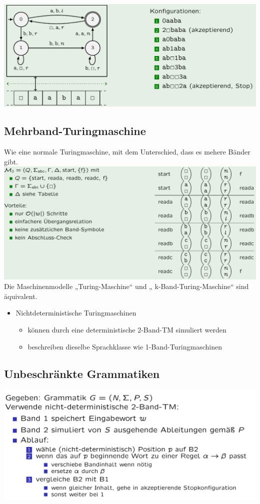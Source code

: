 \documentclass[12pt,a4paper]{article}
\begin{document}
	\begin{center}
	\includegraphics[width=\textwidth]{Bilder/Turing.png}
	\end{center}
	
	\subsection{Mehrband-Turingmaschine}
	Wie eine normale Turingmaschine, mit dem Unterschied, dass es mehere Bänder gibt.
	\includegraphics[width=\textwidth]{Bilder/MehrbandTuring.png}
	Die Maschinenmodelle „Turing-Maschine“ und „ k-Band-Turing-Maschine“ sind äquivalent.
	\begin{itemize}
		\item Nichtdeterministische Turingmaschinen
		\begin{itemize}
			\item können durch eine deterministische 2-Band-TM simuliert werden
			\item beschreiben dieselbe Sprachklasse wie 1-Band-Turingmaschinen
		\end{itemize}
	\end{itemize}

	\subsection{Unbeschränkte Grammatiken}
	\begin{center}
		\includegraphics[width=\textwidth]{Bilder/Typ0Grammatik.png}
	\end{center}
	
\end{document}
